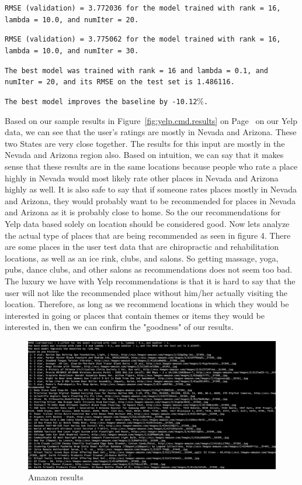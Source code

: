 \documentclass[conference]{IEEEtran}
\begin{document}
\texttt{RMSE (validation) = 3.772036 for the model trained with rank = 16, lambda = 10.0, and numIter = 20.}

\texttt{RMSE (validation) = 3.775062 for the model trained with rank = 16, lambda = 10.0, and numIter = 30.}

\texttt{The best model was trained with rank = 16 and lambda = 0.1, and numIter = 20, and its RMSE on the test set is 1.486116.}

\texttt{The best model improves the baseline by -10.12$\%$.}

Based on our sample results in Figure~\ref{fig:yelp.cmd.results} on Page~\pageref{fig:yelp.cmd.results} on our Yelp data, we can see that the user's ratings are mostly in Nevada and Arizona.  These two States are very close together.  The results for this input are mostly in the Nevada and Arizona region also.  Based on intuition, we can say that it makes sense that these results are in the same locations because people who rate a place highly in Nevada would most likely rate other places in Nevada and Arizona highly as well.  It is also safe to say that if someone rates places mostly in Nevada and Arizona, they would probably want to be recommended for places in Nevada and Arizona as it is probably close to home.  So the our recommendations for Yelp data based solely on location should be considered good.  Now lets analyze the actual type of places that are being recommended as seen in figure 4.  There are some places in the user test data that are chiropractic and rehabilitation locations, as well as an ice rink, clubs, and salons.  So getting massage, yoga, pubs, dance clubs, and other salons as recommendations does not seem too bad.  The luxury we have with Yelp recommendations is that it is hard to say that the user will not like the recommended place without him/her actually visiting the location.  Therefore, as long as we recommend locations in which they would be interested in going or places that contain themes or items they would be interested in, then we can confirm the "goodness" of our results.  

\begin{figure}
  \centering
  \includegraphics[width=.48\textwidth, clip=true, trim = 0cm 3cm 15cm 1cm]{image/amazon_results_crop}
  \caption{Amazon results}
  \label{fig:amazon.cmd.results}
\end{figure}
\end{document}

